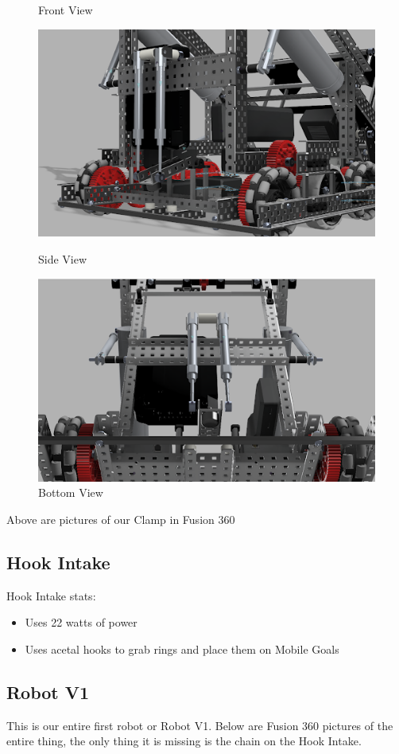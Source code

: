\begin{figure}[h!]
\begin{minipage}{.55\textwidth}
        \caption{Front View}
        \label{fig:front}
    \end{minipage}
    \begin{minipage}{.55\textwidth}
        \centering
        \includegraphics[width=1\linewidth]{images/Side-Clamp-V1.png}
        \caption{Side View}
        \label{fig:side}
    \end{minipage}
    \begin{minipage}{.55\textwidth}
        \centering
        \includegraphics[width=1\linewidth]{images/Bottom-Clamp-V1.png}
        \caption{Bottom View}
        \label{fig:bottom}
    \end{minipage}
\end{figure}

Above are pictures of our Clamp in Fusion 360
\subsection*{Hook Intake}
Hook Intake stats:
\begin{itemize}
    \item Uses 22 watts of power
    \item Uses acetal hooks to grab rings and place them on Mobile Goals
\end{itemize}

\subsection*{Robot V1}
This is our entire first robot or Robot V1. Below are Fusion 360 pictures of the entire thing, the only thing it is missing is the chain on the Hook Intake.
